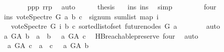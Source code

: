 \begin{isabellebody}
\ \ \ \ \ \ \isamarkupfalse%
\ ppp\ rrp\ \isamarkupfalse%
\ auto\isanewline
\ \ \ \ \isamarkupfalse%
\ {\isacharquery}{\kern0pt}thesis\ \ \isamarkupfalse%
\ ins\ ins{\isacharunderscore}{\kern0pt}{}\ \isamarkupfalse%
\ simp\isanewline
\ \ \isamarkupfalse%
\isanewline
\ \ \ \ \isamarkupfalse%
\ four\isanewline
\ \ \ \ \isamarkupfalse%
\ \isamarkupfalse%
\ ins{\isacharcolon}{\kern0pt}\ {\isachardoublequoteopen}vote{\isacharunderscore}{\kern0pt}Spectre\ G\ a\ b\ c\ {\isacharequal}{\kern0pt}\ signum\ {\isacharparenleft}{\kern0pt}sum{\isacharunderscore}{\kern0pt}list\ {\isacharparenleft}{\kern0pt}map\ {\isacharparenleft}{\kern0pt}{\isasymlambda}i{\isachardot}{\kern0pt}\isanewline
\ \ \ {\isacharparenleft}{\kern0pt}vote{\isacharunderscore}{\kern0pt}Spectre\ G\ i\ b\ c{\isacharparenright}{\kern0pt}{\isacharparenright}{\kern0pt}\ {\isacharparenleft}{\kern0pt}sorted{\isacharunderscore}{\kern0pt}list{\isacharunderscore}{\kern0pt}of{\isacharunderscore}{\kern0pt}set\ {\isacharparenleft}{\kern0pt}future{\isacharunderscore}{\kern0pt}nodes\ G\ a{\isacharparenright}{\kern0pt}{\isacharparenright}{\kern0pt}{\isacharparenright}{\kern0pt}{\isacharparenright}{\kern0pt}{\isachardoublequoteclose}\isanewline
\ \ \ \ \ \ \isamarkupfalse%
\ auto\isanewline
\ \ \ \ \isamarkupfalse%
\ {\isachardoublequoteopen}{\isasymnot}{\isacharparenleft}{\kern0pt}{\isacharparenleft}{\kern0pt}a\ {\isasymrightarrow}\isactrlsup {\isacharplus}{\kern0pt}\isactrlbsub G{\isacharunderscore}{\kern0pt}A\isactrlesub \ b\ {\isasymor}\ a\ {\isacharequal}{\kern0pt}\ b{\isacharparenright}{\kern0pt}\ {\isasymand}\ {\isacharparenleft}{\kern0pt}{\isasymnot}\ a\ {\isasymrightarrow}\isactrlsup {\isacharplus}{\kern0pt}\isactrlbsub G{\isacharunderscore}{\kern0pt}A\isactrlesub \ c{\isacharparenright}{\kern0pt}{\isacharparenright}{\kern0pt}{\isachardoublequoteclose}\ \isamarkupfalse%
\ HB{}{\isachardot}{\kern0pt}reachable{}{\isacharunderscore}{\kern0pt}preserve\ four\ \isamarkupfalse%
\ auto\isanewline
\ \ \ \ \isamarkupfalse%
\ \isamarkupfalse%
\ {\isachardoublequoteopen}{\isasymnot}\ {\isacharparenleft}{\kern0pt}{\isacharparenleft}{\kern0pt}a\ {\isasymrightarrow}\isactrlsup {\isacharplus}{\kern0pt}\isactrlbsub G{\isacharunderscore}{\kern0pt}A\isactrlesub \ c\ {\isasymor}\ a\ {\isacharequal}{\kern0pt}\ c{\isacharparenright}{\kern0pt}\ {\isasymand}\ {\isacharparenleft}{\kern0pt}{\isasymnot}\ a\ {\isasymrightarrow}\isactrlsup {\isacharplus}{\kern0pt}\isactrlbsub G{\isacharunderscore}{\kern0pt}A\isactrlesub \ b{\isacharparenright}{\kern0pt}{\isacharparenright}{\kern0pt}{\isachardoublequoteclose}\ \isanewline

\end{isabellebody}
